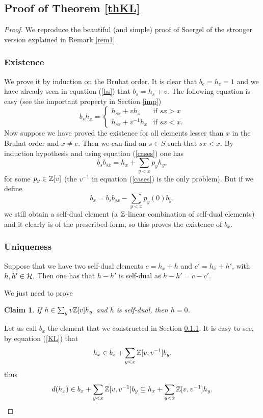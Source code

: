 \documentclass[12pt]{wart}
\newtheorem{claim}[thm]{Claim}
\theoremstyle{remark}
\begin{document}
\subsection{Proof of Theorem \ref{thKL}}\label{proofth}


\begin{proof} We reproduce the  beautiful (and simple) proof  of  Soergel  \cite[Theorem 2.1]{SoKL} of the stronger version explained in Remark  \ref{rem1}. 

\subsubsection{Existence}\label{1}

We prove it by induction on the Bruhat order. It is clear that $b_e=h_e=1$ and we have already seen in equation (\ref{bs}) that $b_s=h_s+v.$ The following equation is easy (see the important property in Section \ref{imp})
\begin{equation}\label{cases}
    b_sh_x=
    \begin{cases}
      h_{sx}+vh_x & \text{if } sx > x\\
      h_{sx}+v^{-1}h_x & \text{if } sx < x.
    \end{cases}
\end{equation}
Now suppose we have proved the existence for all elements lesser than $x$ in the Bruhat order and $x\neq e.$ Then we can find an $s\in S$ such that $sx<x$. By  induction hypothesis and using equation (\ref{cases}) one has \begin{equation} b_sb_{sx}=h_x+\sum_{y<x} p_{y}h_y, \end{equation} for some $p_{y}\in \mathbb Z[v]$ (the $v^{-1}$ in equation (\ref{cases}) is the only problem). But if we define \begin{equation}b_x=b_sb_{sx}-\sum_{y<x} p_{y}(0)b_y,\end{equation}
we still obtain a self-dual element (a $\mathbb Z$-linear combination of self-dual elements) and it clearly is of the prescribed form, so this proves the existence of $b_x.$


\subsubsection{Uniqueness}

Suppose that we have two self-dual elements $c=h_x+h$ and $c'=h_x+h'$, with $h,h' \in \mathcal H. $ Then one has that $h-h'$ is self-dual as $h-h'=c-c'.$

We just need to prove 
\begin{claim}
If $h\in \sum_yv\mathbb Z[v] h_y$ and $h$ is self-dual, then $h=0$. 
\end{claim}
Let us call $b_x$ the element that we constructed  in Section \ref{1}. It is easy to see, by equation (\ref{KL}) that $$h_x\in b_x+\sum_{y<x}\mathbb Z[v,v^{-1}]b_y,$$
thus \begin{equation}\label{d}d(h_x)\in b_x+\sum_{y<x}\mathbb Z[v,v^{-1}]b_y \subseteq  h_x+\sum_{y<x}\mathbb Z[v,v^{-1}]h_y.\end{equation}



\end{proof}
\end{document}
